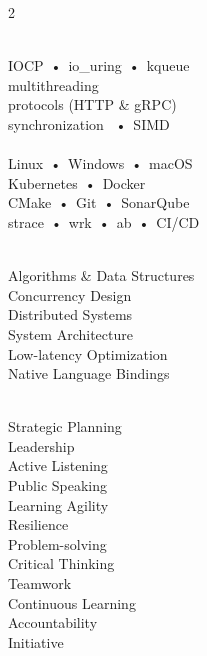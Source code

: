 \documentclass[pastel]{simplehipstercv}
\begin{document}
\begin{paracol}{2}
{\flushright
{} \\%
IOCP~•~io\_uring~•~kqueue\\%
multithreading \\%
protocols (HTTP \& gRPC) \\%
synchronization ~•~SIMD \\%

\vspace{1em}
 \\%
Linux~•~Windows~•~macOS \\%
Kubernetes~•~Docker \\%
CMake~•~Git~•~SonarQube \\%
strace~•~wrk~•~ab~•~CI/CD \\%

\vspace{1em}

 \\%
Algorithms \& Data Structures\\%
Concurrency Design \\%
Distributed Systems \\%
System Architecture \\%
Low-latency Optimization \\%
Native Language Bindings

\vspace{1em}

 \\%
Strategic Planning\\
Leadership\\
Active Listening\\
Public Speaking\\
Learning Agility\\
Resilience\\
Problem-solving\\
Critical Thinking\\
Teamwork\\
Continuous Learning\\
Accountability\\
Initiative\\

}
\end{paracol}
\end{document}
